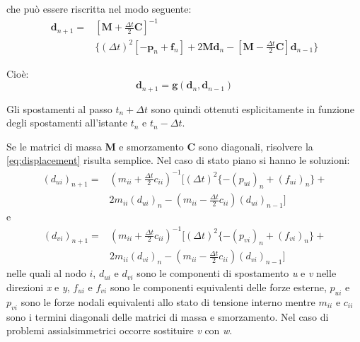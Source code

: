 che può essere riscritta nel modo seguente:
\begin{equation}
	\begin{split}
	\boldsymbol{d}_{n+1} = & [\boldsymbol{M} + \frac{\varDelta t}{2} \boldsymbol{C}]^{-1} \\
	                       & \{ (\varDelta t)^2 [- \boldsymbol{p}_n + \boldsymbol{f}_n ] +
	2 \boldsymbol{M} \boldsymbol{d}_n - [\boldsymbol{M} - \frac{\varDelta t}{2} \boldsymbol{C}] \boldsymbol{d}_{n-1} \}
	\end{split}
\end{equation}

Cioè:
\begin{equation}
	\boldsymbol{d}_{n+1} = \boldsymbol{g}(\boldsymbol{d}_{n}, \boldsymbol{d}_{n-1})
	\label{eq:displacement}
\end{equation}

Gli spostamenti al passo $t_n + \varDelta t$ sono quindi ottenuti esplicitamente in funzione degli spostamenti all'istante $t_n$ e $t_n - \varDelta t$.

Se le matrici di massa \textbf{M} e smorzamento \textbf{C} sono diagonali, risolvere la \ref{eq:displacement} risulta semplice. Nel caso di stato piano si hanno le soluzioni:
\begin{equation} 
	\begin{split}
		(d_{ui})_{n+1} = & (m_{ii} + \frac{\varDelta t}{2} c_{ii})^{-1} [(\varDelta t)^2 \{ - (p_{ui})_n + (f_{ui})_n \} + \\ 
		&2 m_{ii} (d_{ui})_n - (m_{ii} - \frac{\varDelta t}{2} c_{ii}) (d_{ui})_{n-1}]
	\end{split}
	\label{eq:dispx} 
\end{equation}
e
\begin{equation} 
	\begin{split}
		(d_{vi})_{n+1} = & (m_{ii} + \frac{\varDelta t}{2} c_{ii})^{-1} [(\varDelta t)^2 \{ - (p_{vi})_n + (f_{vi})_n \} + \\ 
		&2 m_{ii} (d_{vi})_n - (m_{ii} - \frac{\varDelta t}{2} c_{ii}) (d_{vi})_{n-1} ]
	\end{split} 
\end{equation}
nelle quali al nodo $i$, $d_{ui}$ e $d_{vi}$ sono le componenti di spostamento \textit{u} e \textit{v} nelle direzioni \textit{x} e \textit{y}, $f_{ui}$ e $f_{vi}$ sono le componenti equivalenti delle forze esterne,  $p_{ui}$ e $p_{vi}$ sono le forze nodali equivalenti allo stato di tensione interno mentre $m_{ii}$ e $c_{ii}$ sono i termini diagonali delle matrici di massa e smorzamento. Nel caso di problemi assialsimmetrici occorre sostituire \textit{v} con \textit{w}.


